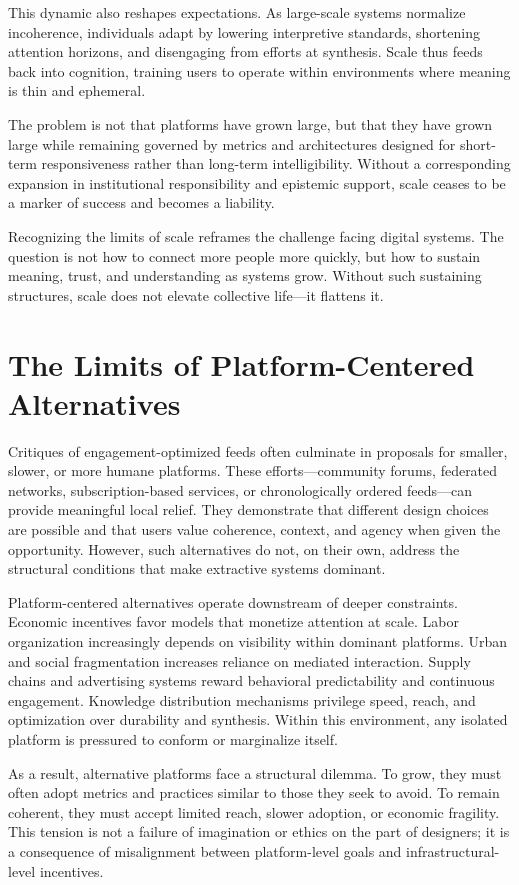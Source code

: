 \documentclass[12pt]{article}
\begin{document}
This dynamic also reshapes expectations. As large-scale systems normalize incoherence, individuals adapt by lowering interpretive standards, shortening attention horizons, and disengaging from efforts at synthesis. Scale thus feeds back into cognition, training users to operate within environments where meaning is thin and ephemeral.

The problem is not that platforms have grown large, but that they have grown large while remaining governed by metrics and architectures designed for short-term responsiveness rather than long-term intelligibility. Without a corresponding expansion in institutional responsibility and epistemic support, scale ceases to be a marker of success and becomes a liability.

Recognizing the limits of scale reframes the challenge facing digital systems. The question is not how to connect more people more quickly, but how to sustain meaning, trust, and understanding as systems grow. Without such sustaining structures, scale does not elevate collective life—it flattens it.

\section{The Limits of Platform-Centered Alternatives}

Critiques of engagement-optimized feeds often culminate in proposals for smaller, slower, or more humane platforms. These efforts—community forums, federated networks, subscription-based services, or chronologically ordered feeds—can provide meaningful local relief. They demonstrate that different design choices are possible and that users value coherence, context, and agency when given the opportunity. However, such alternatives do not, on their own, address the structural conditions that make extractive systems dominant.

Platform-centered alternatives operate downstream of deeper constraints. Economic incentives favor models that monetize attention at scale. Labor organization increasingly depends on visibility within dominant platforms. Urban and social fragmentation increases reliance on mediated interaction. Supply chains and advertising systems reward behavioral predictability and continuous engagement. Knowledge distribution mechanisms privilege speed, reach, and optimization over durability and synthesis. Within this environment, any isolated platform is pressured to conform or marginalize itself.

As a result, alternative platforms face a structural dilemma. To grow, they must often adopt metrics and practices similar to those they seek to avoid. To remain coherent, they must accept limited reach, slower adoption, or economic fragility. This tension is not a failure of imagination or ethics on the part of designers; it is a consequence of misalignment between platform-level goals and infrastructural-level incentives.
\end{document}
